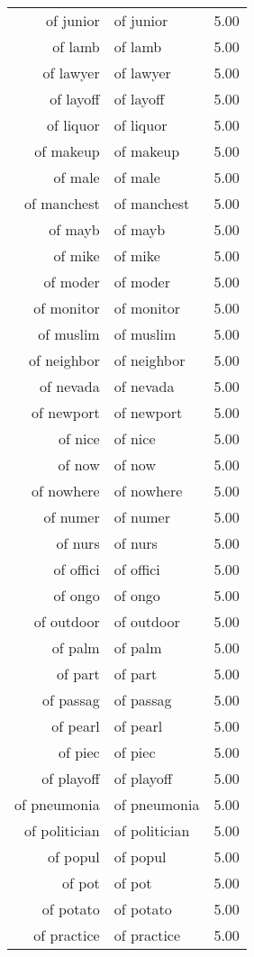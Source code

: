 \begin{table}[ht]
\begin{tabular}{rlr}
  of junior & of junior & 5.00 \\ 
  of lamb & of lamb & 5.00 \\ 
  of lawyer & of lawyer & 5.00 \\ 
  of layoff & of layoff & 5.00 \\ 
  of liquor & of liquor & 5.00 \\ 
  of makeup & of makeup & 5.00 \\ 
  of male & of male & 5.00 \\ 
  of manchest & of manchest & 5.00 \\ 
  of mayb & of mayb & 5.00 \\ 
  of mike & of mike & 5.00 \\ 
  of moder & of moder & 5.00 \\ 
  of monitor & of monitor & 5.00 \\ 
  of muslim & of muslim & 5.00 \\ 
  of neighbor & of neighbor & 5.00 \\ 
  of nevada & of nevada & 5.00 \\ 
  of newport & of newport & 5.00 \\ 
  of nice & of nice & 5.00 \\ 
  of now & of now & 5.00 \\ 
  of nowhere & of nowhere & 5.00 \\ 
  of numer & of numer & 5.00 \\ 
  of nurs & of nurs & 5.00 \\ 
  of offici & of offici & 5.00 \\ 
  of ongo & of ongo & 5.00 \\ 
  of outdoor & of outdoor & 5.00 \\ 
  of palm & of palm & 5.00 \\ 
  of part & of part & 5.00 \\ 
  of passag & of passag & 5.00 \\ 
  of pearl & of pearl & 5.00 \\ 
  of piec & of piec & 5.00 \\ 
  of playoff & of playoff & 5.00 \\ 
  of pneumonia & of pneumonia & 5.00 \\ 
  of politician & of politician & 5.00 \\ 
  of popul & of popul & 5.00 \\ 
  of pot & of pot & 5.00 \\ 
  of potato & of potato & 5.00 \\ 
  of practice & of practice & 5.00 \\ 

\end{tabular}
\end{table}
